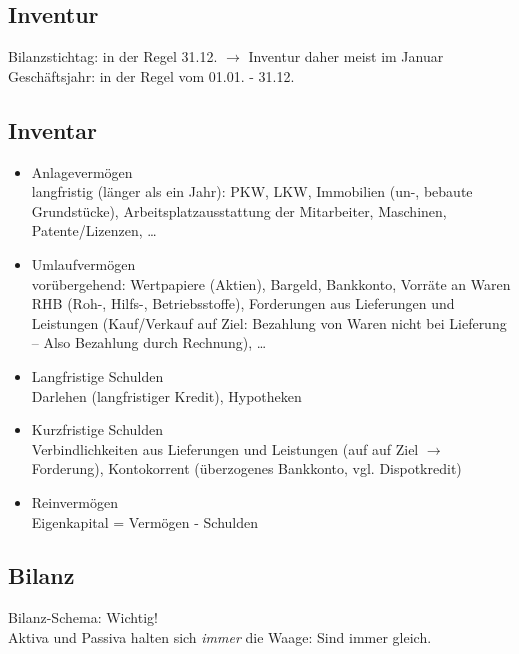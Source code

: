 \subsection{Inventur}
Bilanzstichtag: in der Regel 31.12. $\to$ Inventur daher meist im Januar\\
Geschäftsjahr: in der Regel vom 01.01. - 31.12.
\subsection{Inventar}
\begin{itemize}
\item Anlagevermögen\\
langfristig (länger als ein Jahr): PKW, LKW, Immobilien (un-, bebaute Grundstücke), Arbeitsplatzausstattung der Mitarbeiter, Maschinen, Patente/Lizenzen, …
\item Umlaufvermögen\\
vorübergehend: Wertpapiere (Aktien), Bargeld, Bankkonto, Vorräte an Waren RHB (Roh-, Hilfs-, Betriebsstoffe), Forderungen aus Lieferungen und Leistungen (Kauf/Verkauf auf Ziel: Bezahlung von Waren nicht bei Lieferung -- Also Bezahlung durch Rechnung), …
\item Langfristige Schulden\\
Darlehen (langfristiger Kredit), Hypotheken
\item Kurzfristige Schulden\\
Verbindlichkeiten aus Lieferungen und Leistungen (auf auf Ziel $\to$ Forderung), Kontokorrent (überzogenes Bankkonto, vgl. Dispotkredit)
\item Reinvermögen\\
Eigenkapital = Vermögen - Schulden
\end{itemize}
\subsection{Bilanz}
Bilanz-Schema: Wichtig!\\
Aktiva und Passiva halten sich \emph{immer} die Waage: Sind immer gleich.

